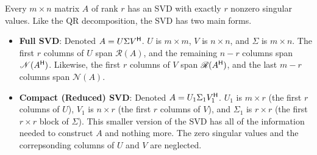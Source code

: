 Every $m\times n$ matrix $A$ of rank $r$ has an SVD with exactly $r$ nonzero singular values.
Like the QR decomposition, the SVD has two main forms.
\begin{itemize}
    \item \textbf{Full SVD}: Denoted $A = U\Sigma V^{\mathsf H}$.
    $U$ is $m\times m$, $V$ is $n\times n$, and $\Sigma$ is $m\times n$.
    The first $r$ columns of $U$ span $\mathscr{R}(A)$, and the remaining $n -r$ columns span $\mathscr{N}(A^{\mathsf H})$.
    Likewise, the first $r$ columns of $V$ span $\mathscr{R}(A^{\mathsf H})$, and the last $m - r$ columns span $\mathscr{N}(A)$.
    \item \textbf{Compact (Reduced) SVD}: Denoted $A = U_1\Sigma_1 V^{\mathsf H}_1$.
    $U_1$ is $m\times r$ (the first $r$ columns of $U$), $V_1$ is $n \times r$ (the first $r$ columns of $V$), and $\Sigma_1$ is $r\times r$ (the first $r\times r$ block of $\Sigma$).
    This smaller version of the SVD has all of the information needed to construct $A$ and nothing more.
    The zero singular values and the correpsonding columns of $U$ and $V$ are neglected.
\end{itemize}
%
